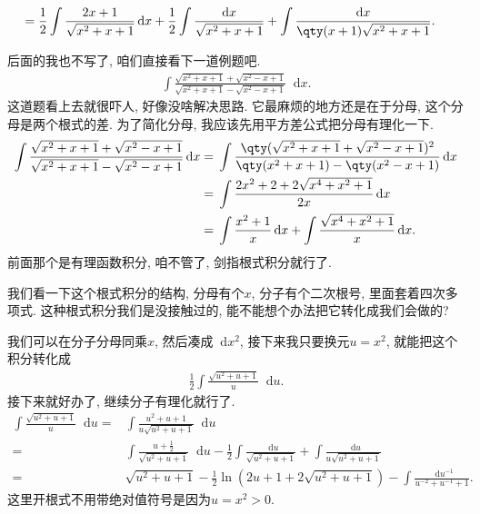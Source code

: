 \documentclass{ctexbook}
\newcommand*{\dif}{\mathop{}\!\mathrm{d}}
\begin{document}
{\begin{align*}
={}&\frac{1}{2}\int\frac{2x+1}{\sqrt{x^{2}+x+1}}\dif{x}+\frac{1}{2}\int\frac{\dif{x}}{\sqrt{x^{2}+x+1}}+\int\frac{\dif{x}}{\qty(x+1)\sqrt{x^{2}+x+1}}
.\end{align*}\par
后面的我也不写了, 咱们直接看下一道例题吧. 
\begin{align*}
\int\frac{\sqrt{x^{2}+x+1}+\sqrt{x^{2}-x+1}}{\sqrt{x^{2}+x+1}-\sqrt{x^{2}-x+1}}\dif{x}
.\end{align*}
这道题看上去就很吓人, 好像没啥解决思路. 它最麻烦的地方还是在于分母, 这个分母是两个根式的差. 为了简化分母, 我应该先用平方差公式把分母有理化一下. 
\begin{align*}
\int\frac{\sqrt{x^{2}+x+1}+\sqrt{x^{2}-x+1}}{\sqrt{x^{2}+x+1}-\sqrt{x^{2}-x+1}}\dif{x}={}&\int\frac{\qty(\sqrt{x^{2}+x+1}+\sqrt{x^{2}-x+1})^{2}}{\qty(x^{2}+x+1)-\qty(x^{2}-x+1)}\dif{x}\\
={}&\int\frac{2x^{2}+2+2\sqrt{x^{4}+x^{2}+1}}{2x}\dif{x}\\
={}&\int\frac{x^{2}+1}{x}\dif{x}+\int\frac{\sqrt{x^{4}+x^{2}+1}}{x}\dif{x}
.\end{align*}
前面那个是有理函数积分, 咱不管了, 剑指根式积分就行了. \par
我们看一下这个根式积分的结构, 分母有个$x$, 分子有个二次根号, 里面套着四次多项式. 这种根式积分我们是没接触过的, 能不能想个办法把它转化成我们会做的? \par
我们可以在分子分母同乘$x$, 然后凑成$\dif{x^{2}}$, 接下来我只要换元$u=x^{2}$, 就能把这个积分转化成
\begin{align*}
\frac{1}{2}\int\frac{\sqrt{u^{2}+u+1}}{u}\dif{u}
.\end{align*}
接下来就好办了, 继续分子有理化就行了. 
\begin{align*}
\int\frac{\sqrt{u^{2}+u+1}}{u}\dif{u}={}&\int\frac{u^{2}+u+1}{u\sqrt{u^{2}+u+1}}\dif{u}\\
={}&\int\frac{u+\frac{1}{2}}{\sqrt{u^{2}+u+1}}\dif{u}-\frac{1}{2}\int\frac{\dif{u}}{\sqrt{u^{2}+u+1}}+\int\frac{\dif{u}}{u\sqrt{u^{2}+u+1}}\\
={}&\sqrt{u^{2}+u+1}-\frac{1}{2}\ln(2u+1+2\sqrt{u^{2}+u+1})-\int\frac{\dif{u^{-1}}}{u^{-2}+u^{-1}+1}
.\end{align*}
这里开根式不用带绝对值符号是因为$u=x^{2}>0$. \par
}
\end{document}
